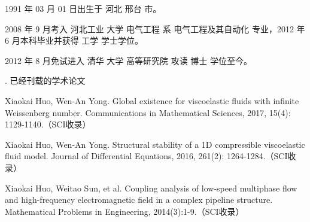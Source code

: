 \begin{resume}


  1991 年 03 月 01 日出生于 河北 邢台 市。

  2008 年 9 月考入 河北工业 大学  电气工程 系 电气工程及其自动化 专业，2012 年 6 月本科毕业并获得 工学 学士学位。

  2012 年 8 月免试进入 清华 大学 高等研究院 攻读 博士 学位至今。

. 已经刊载的学术论文%

  \begin{publications}
  \item Xiaokai Huo, Wen-An Yong. Global existence for viscoelastic fluids with infinite Weissenberg number. Communications in Mathematical Sciences, 2017, 15(4): 1129-1140.（SCI收录）
  \item Xiaokai Huo, Wen-An Yong. Structural stability of a 1D compressible viscoelastic fluid model. Journal of Differential Equations, 2016, 261(2): 1264-1284.（SCI收录）
  \item Xiaokai Huo, Weitao Sun, et al. Coupling analysis of low-speed multiphase flow and high-frequency electromagnetic field in a complex pipeline structure. Mathematical Problems in Engineering, 2014(3):1-9.（SCI收录）
  \end{publications}



\end{resume}
